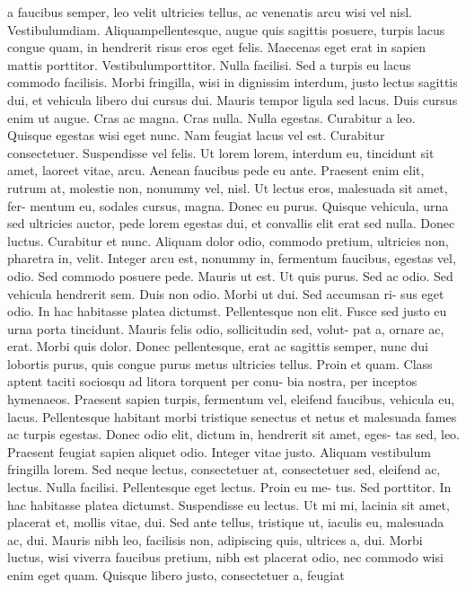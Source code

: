 a faucibus semper, leo velit ultricies tellus, ac venenatis arcu wisi vel nisl.
Vestibulumdiam. Aliquampellentesque, augue quis sagittis posuere, turpis
lacus congue quam, in hendrerit risus eros eget felis. Maecenas eget erat in
sapien mattis porttitor. Vestibulumporttitor. Nulla facilisi. Sed a turpis eu
lacus commodo facilisis. Morbi fringilla, wisi in dignissim interdum, justo
lectus sagittis dui, et vehicula libero dui cursus dui. Mauris tempor ligula
sed lacus. Duis cursus enim ut augue. Cras ac magna. Cras nulla. Nulla
egestas. Curabitur a leo. Quisque egestas wisi eget nunc. Nam feugiat lacus
vel est. Curabitur consectetuer.
Suspendisse vel felis. Ut lorem lorem, interdum eu, tincidunt sit amet,
laoreet vitae, arcu. Aenean faucibus pede eu ante. Praesent enim elit, rutrum
at, molestie non, nonummy vel, nisl. Ut lectus eros, malesuada sit amet, fer-
mentum eu, sodales cursus, magna. Donec eu purus. Quisque vehicula, urna
sed ultricies auctor, pede lorem egestas dui, et convallis elit erat sed nulla.
Donec luctus. Curabitur et nunc. Aliquam dolor odio, commodo pretium,
ultricies non, pharetra in, velit. Integer arcu est, nonummy in, fermentum
faucibus, egestas vel, odio.
Sed commodo posuere pede. Mauris ut est. Ut quis purus. Sed ac odio.
Sed vehicula hendrerit sem. Duis non odio. Morbi ut dui. Sed accumsan ri-
sus eget odio. In hac habitasse platea dictumst. Pellentesque non elit. Fusce
sed justo eu urna porta tincidunt. Mauris felis odio, sollicitudin sed, volut-
pat a, ornare ac, erat. Morbi quis dolor. Donec pellentesque, erat ac sagittis
semper, nunc dui lobortis purus, quis congue purus metus ultricies tellus.
Proin et quam. Class aptent taciti sociosqu ad litora torquent per conu-
bia nostra, per inceptos hymenaeos. Praesent sapien turpis, fermentum vel,
eleifend faucibus, vehicula eu, lacus.
Pellentesque habitant morbi tristique senectus et netus et malesuada
fames ac turpis egestas. Donec odio elit, dictum in, hendrerit sit amet, eges-
tas sed, leo. Praesent feugiat sapien aliquet odio. Integer vitae justo. Aliquam
vestibulum fringilla lorem. Sed neque lectus, consectetuer at, consectetuer
sed, eleifend ac, lectus. Nulla facilisi. Pellentesque eget lectus. Proin eu me-
tus. Sed porttitor. In hac habitasse platea dictumst. Suspendisse eu lectus.
Ut mi mi, lacinia sit amet, placerat et, mollis vitae, dui. Sed ante tellus,
tristique ut, iaculis eu, malesuada ac, dui. Mauris nibh leo, facilisis non,
adipiscing quis, ultrices a, dui.
Morbi luctus, wisi viverra faucibus pretium, nibh est placerat odio, nec
commodo wisi enim eget quam. Quisque libero justo, consectetuer a, feugiat
